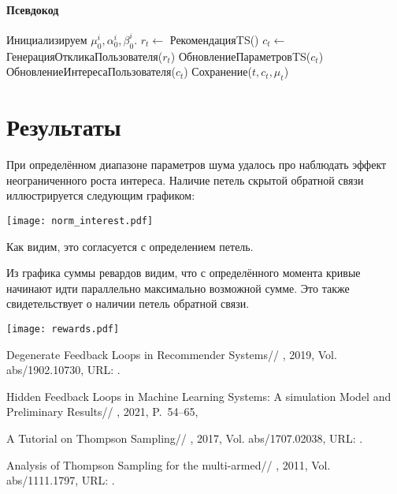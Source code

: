 \documentclass[12pt, twoside]{article}
\begin{document}
\paragraph{Псевдокод}
\begin{algorithmic}
  \STATE Инициализируем $\mu_0^i, \alpha_0^i, \beta_0^i$.
    \STATE $r_t \leftarrow$ РекомендацияTS()
    \STATE $c_t \leftarrow$ ГенерацияОткликаПользователя($r_t$)
    \STATE ОбновлениеПараметровTS($c_t$)
    \STATE ОбновлениеИнтересаПользователя($c_t$)
    \STATE Сохранение($t, c_t, \mu_t$)
  \ENDFOR
\end{algorithmic}

\section{Результаты}
При определённом диапазоне параметров шума удалось про наблюдать эффект неограниченного роста интереса. 
Наличие петель скрытой обратной связи иллюстрируется следующим графиком: 
\begin{center}
  \texttt{[image: norm\_interest.pdf]}
\end{center}
Как видим, это согласуется с определением петель. 

Из графика суммы ревардов видим, что с определённого момента кривые начинают идти параллельно максимально возможной сумме. 
Это также свидетельствует о наличии петель обратной связи. 
\begin{center}
  \texttt{[image: rewards.pdf]}
\end{center}
\begin{thebibliography}{99}
    Degenerate Feedback Loops in Recommender Systems//
    , 2019, Vol. abs/1902.10730,
	  URL: .

    Hidden Feedback Loops in Machine Learning Systems: A simulation Model and Preliminary Results//
    , 2021, P.~54--65,

    A Tutorial on Thompson Sampling//
    , 2017, Vol. abs/1707.02038,
	  URL: .

    Analysis of Thompson Sampling for the multi-armed//
    , 2011, Vol. abs/1111.1797,
	  URL: .
\end{thebibliography}

\end{document}
